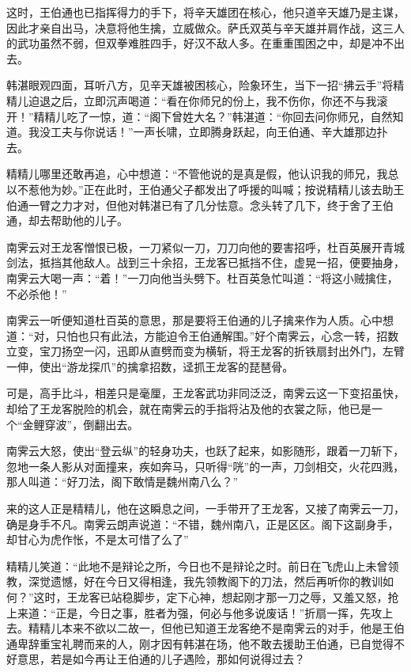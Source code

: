 \documentclass[12pt,oneside]{book}
\begin{document}
这时，王伯通也已指挥得力的手下，将辛天雄团在核心，他只道辛天雄乃是主谋，因此才亲自出马，决意将他生擒，立威做众。萨氏双英与辛天雄并肩作战，这三人的武功虽然不弱，但双拳难胜四手，好汉不敌人多。在重重围困之中，却是冲不出去。

韩湛眼观四面，耳听八方，见辛天雄被困核心，险象环生，当下一招``拂云手''将精精儿迫退之后，立即沉声喝道：``看在你师兄的份上，我不伤你，你还不与我滚开！''精精儿吃了一惊，道：``阁下曾姓大名？''韩湛道：``你回去问你师兄，自然知道。我没工夫与你说话！''一声长啸，立即腾身跃起，向王伯通、辛大雄那边扑去。

精精儿哪里还敢再追，心中想道：``不管他说的是真是假，他认识我的师兄，我总以不惹他为妙。''正在此时，王伯通父子都发出了呼援的叫喊；按说精精儿该去助王伯通一臂之力才对，但他对韩湛已有了几分怯意。念头转了几下，终于舍了王伯通，却去帮助他的儿子。

南霁云对王龙客憎恨已极，一刀紧似一刀，刀刀向他的要害招呼，杜百英展开青城剑法，抵挡其他敌人。战到三十余招，王龙客已抵挡不住，虚晃一招，便要抽身，南霁云大喝一声：``着！''一刀向他当头劈下。杜百英急忙叫道：``将这小贼擒住，不必杀他！''

南霁云一听便知道杜百英的意思，那是要将王伯通的儿子擒来作为人质。心中想道：``对，只怕也只有此法，方能迫令王伯通解围。''好个南霁云，心念一转，招数立变，宝刀扬空一闪，迅即从直劈而变为横斩，将王龙客的折铁扇封出外门，左臂一伸，使出``游龙探爪''的擒拿招数，迳抓王龙客的琵琶骨。

可是，高手比斗，相差只是毫厘，王龙客武功非同泛泛，南霁云这一下变招虽快，却给了王龙客脱险的机会，就在南霁云的手指将沾及他的衣裳之际，他已是一个``金鲤穿波''，倒翻出去。

南霁云大怒，使出``登云纵''的轻身功夫，也跃了起来，如影随形，跟着一刀斩下，忽地一条人影从对面撞来，疾如奔马，只听得``咣''的一声，刀剑相交，火花四溅，那人叫道：``好刀法，阁下敢情是魏州南八么？''

来的这人正是精精儿，他在这瞬息之间，一手带开了王龙客，又接了南霁云一刀，确是身手不凡。南霁云朗声说道：``不错，魏州南八，正是区区。阁下这副身手，却甘心为虎作怅，不是太可惜了么了''

精精儿笑道：``此地不是辩论之所，今日也不是辩论之时。前日在飞虎山上未曾领教，深觉遗憾，好在今日又得相逢，我先领教阁下的刀法，然后再听你的教训如何？''这时，王龙客已站稳脚步，定下心神，想起刚才那一刀之辱，又羞又怒，抢上来道：``正是，今日之事，胜者为强，何必与他多说废话！''折扇一挥，先攻上去。精精儿本来不欲以二故一，但他已知道王龙客绝不是南霁云的对手，他是王伯通卑辞重宝礼聘而来的人，刚才因有韩湛在场，他不敢去援助王伯通，已自觉得不好意思，若是如今再让王伯通的儿子遇险，那如何说得过去？
\end{document}
